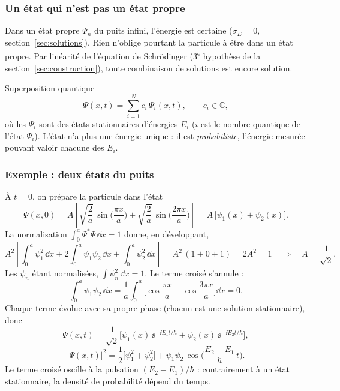 \subsubsection{Un état qui n'est pas un état propre}

Dans un état propre $\Psi_n$ du puits infini, l'énergie est certaine
($\sigma_E=0$, section~\ref{sec:solutions}). Rien n'oblige pourtant la particule à
être dans un état propre. Par linéarité de l'équation de Schrödinger
(3\textsuperscript{e} hypothèse de la section~\ref{sec:construction}), toute
combinaison de solutions est encore solution.

\begin{definition}{Superposition quantique}
\[
  \Psi(x,t)=\sum_{i=1}^{N}c_i\,\Psi_i(x,t),
  \qquad c_i\in\mathbb{C},
\]
où les $\Psi_i$ sont des états stationnaires d'énergies $E_i$ ($i$ est le nombre
quantique de l'état $\Psi_i$). L'état n'a plus une énergie unique : il est
\emph{probabiliste}, l'énergie mesurée pouvant valoir chacune des $E_i$.
\end{definition}

\subsubsection{Exemple : deux états du puits}

À $t=0$, on prépare la particule dans l'état
\[
  \Psi(x,0)=A\left[\sqrt{\frac{2}{a}}\,\sin\!\Big(\frac{\pi x}{a}\Big)
                  +\sqrt{\frac{2}{a}}\,\sin\!\Big(\frac{2\pi x}{a}\Big)\right]
  =A\,\big[\psi_1(x)+\psi_2(x)\big].
\]
La normalisation $\int_0^a\Psi^*\Psi\,\dd x=1$ donne, en développant,
\[
  A^2\left[\int_0^a\psi_1^2\,\dd x+2\int_0^a\psi_1\psi_2\,\dd x+\int_0^a\psi_2^2\,\dd x\right]
  =A^2\,(1+0+1)=2A^2=1
  \quad\Longrightarrow\quad A=\frac{1}{\sqrt2}.
\]
Les $\psi_n$ étant normalisées, $\int\psi_n^2\,\dd x=1$. Le terme croisé s'annule :
\[
  \int_0^a\psi_1\psi_2\,\dd x
  =\frac{1}{a}\int_0^a\Big[\cos\frac{\pi x}{a}-\cos\frac{3\pi x}{a}\Big]\dd x=0 .
\]
Chaque terme évolue avec sa propre phase (chacun est une solution stationnaire), donc
\[
  \Psi(x,t)=\frac{1}{\sqrt2}\Big[\psi_1(x)\,\ee^{-\ii E_1t/\hbar}
                                 +\psi_2(x)\,\ee^{-\ii E_2t/\hbar}\Big],
\]
\[
  |\Psi(x,t)|^2=\frac12\big[\psi_1^2+\psi_2^2\big]
                +\psi_1\psi_2\,\cos\!\Big(\frac{E_2-E_1}{\hbar}\,t\Big).
\]
Le terme croisé oscille à la pulsation $(E_2-E_1)/\hbar$ : contrairement à un état
stationnaire, la densité de probabilité dépend du temps.

